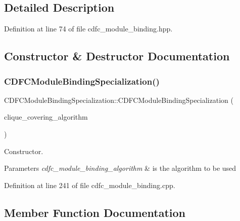 \subsection{Detailed Description}


Definition at line 74 of file cdfc\+\_\+module\+\_\+binding.\+hpp.



\subsection{Constructor \& Destructor Documentation}
\mbox{\label{classCDFCModuleBindingSpecialization_a5b9c2b00f88126fec762d122761741f0}} 
\subsubsection{\texorpdfstring{C\+D\+F\+C\+Module\+Binding\+Specialization()}{CDFCModuleBindingSpecialization()}}
{\footnotesize\ttfamily C\+D\+F\+C\+Module\+Binding\+Specialization\+::\+C\+D\+F\+C\+Module\+Binding\+Specialization (\begin{DoxyParamCaption}\item[{const \hyperlink{clique__covering_8hpp_acc23ade19dac4d6935b7792353e207d9}{Clique\+Covering\+\_\+\+Algorithm}}]{clique\+\_\+covering\+\_\+algorithm }\end{DoxyParamCaption})\hspace{0.3cm}{\ttfamily [explicit]}}



Constructor. 


\begin{DoxyParams}{Parameters}
{\em cdfc\+\_\+module\+\_\+binding\+\_\+algorithm} & is the algorithm to be used \\
\hline
\end{DoxyParams}


Definition at line 241 of file cdfc\+\_\+module\+\_\+binding.\+cpp.



\subsection{Member Function Documentation}
\mbox{\label{classCDFCModuleBindingSpecialization_a1696e824eb66cbcf6b94992c2bddf943}} 
